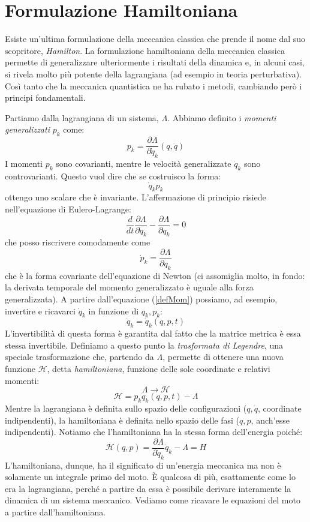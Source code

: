 \documentclass[a4paper,openany]{article}
\begin{document}
	\section{Formulazione Hamiltoniana}
	Esiste un'ultima formulazione della meccanica classica che prende il nome dal suo scopritore, \textit{Hamilton}. La formulazione hamiltoniana della meccanica classica permette di generalizzare ulteriormente i risultati della dinamica e, in alcuni casi, si rivela molto più potente della lagrangiana (ad esempio in teoria perturbativa). Così tanto che la meccanica quantistica ne ha rubato i metodi, cambiando però i principi fondamentali.
	
	Partiamo dalla lagrangiana di un sistema, $\Lambda$. Abbiamo definito i \textit{momenti generalizzati} $p_k$ come:
	\begin{equation}
		p_{k} = \dfrac{\partial \Lambda}{\partial \dot{q}_k}(q,\dot{q})
		\label{defMom}
	\end{equation}
	I momenti $p_k$ sono covarianti, mentre le velocità generalizzate $\dot{q}_k$ sono controvarianti. Questo vuol dire che se costruisco la forma:
	$$
	\dot{q}_k p_k
	$$
	ottengo uno scalare che è invariante. L'affermazione di principio risiede nell'equazione di Eulero-Lagrange:
	\begin{equation}\label{key}
		\dfrac{d}{dt} \dfrac{\partial \Lambda}{\partial \dot{q}_k} - \dfrac{\partial \Lambda}{\partial q_k} = 0
	\end{equation}
che posso riscrivere comodamente come
	$$
	\dot{p}_k = \dfrac{\partial \Lambda}{\partial q_k}
	$$
	che è la forma covariante dell'equazione di Newton (ci assomiglia molto, in fondo: la derivata temporale del momento generalizzato è uguale alla forza generalizzata). A partire dall'equazione (\ref{defMom}) possiamo, ad esempio, invertire e ricavarci $\dot{q}_k$ in funzione di $q_k,p_k$:
	$$
	\dot{q}_k = \dot{q}_k (q,p,t)
	$$
	L'invertibilità di questa forma è garantita dal fatto che la matrice metrica è essa stessa invertibile. Definiamo a questo punto la \textit{trasformata di Legendre}, una speciale trasformazione che, partendo da $\Lambda$, permette di ottenere una nuova funzione $\mathcal{H}$, detta \textit{hamiltoniana}, funzione delle sole coordinate e relativi momenti:
	\begin{equation}\label{key}
		\Lambda \rightarrow \mathcal{H}
	\end{equation}
	\begin{equation}\label{key}
		\mathcal{H} = p_{k}\dot{q}_k(q,p,t) - \Lambda 
	\end{equation}
	Mentre la lagrangiana è definita sullo spazio delle configurazioni ($q, \dot{q}$, coordinate indipendenti), la hamiltoniana è definita nello spazio delle fasi ($q,p$, anch'esse indipendenti). Notiamo che l'hamiltoniana ha la stessa forma dell'energia poiché:
	$$
	\mathcal{H}(q,p) = \dfrac{\partial \Lambda}{\partial \dot{q}_k}\dot{q}_k - \Lambda = H 
	$$
	L'hamiltoniana, dunque, ha il significato di un'energia meccanica ma non è solamente un integrale primo del moto. È qualcosa di più, esattamente come lo era la lagrangiana, perché a partire da essa è possibile derivare interamente la dinamica di un sistema meccanico. Vediamo come ricavare le equazioni del moto a partire dall'hamiltoniana.
\end{document}
